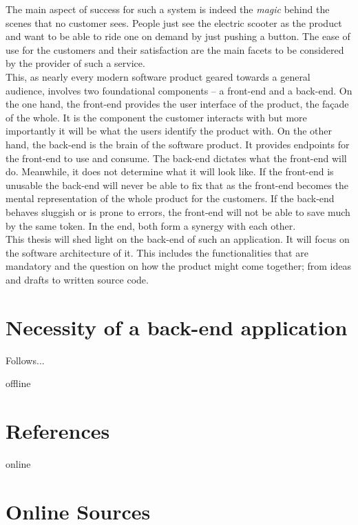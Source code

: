 \documentclass[12pt,a4paper]{report}
\begin{document}
The main aspect of success for such a system is indeed the \emph{magic} behind the scenes
that no customer sees. People just see the electric scooter as the product and
want to be able to ride one on demand by just pushing a button.
The ease of use for the customers and their satisfaction are the main facets
to be considered by the provider of such a service.\\
This, as nearly every modern software product geared towards a general audience,
involves two foundational components – a front-end and a back-end.
On the one hand, the front-end provides the user interface of the product, the façade of the whole.
It is the component the customer interacts with but more importantly it will be
what the users identify the product with.
On the other hand, the back-end is the brain of the software product.
It provides endpoints for the front-end to use and consume. The back-end dictates
what the front-end will do. Meanwhile, it does not determine what it will look like.
If the front-end is unusable the back-end will never be able to fix that as the
front-end becomes the mental representation of the whole product for the customers.
If the back-end behaves sluggish or is prone to errors, the front-end will not be able to save much
by the same token. In the end, both form a synergy with each other.\\
This thesis will shed light on the back-end of such an application.
It will focus on the software architecture of it.
This includes the functionalities that are mandatory and the question on how the product
might come together; from ideas and drafts to written source code.


\section{Necessity of a back-end application}

Follows...


\newpage



\begin{btSect}{offline}
\section*{References}
\btPrintCited
\end{btSect}
\begin{btSect}{online}
\section*{Online Sources}
\btPrintCited
\end{btSect}
\end{document}
